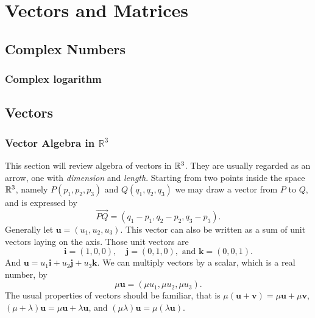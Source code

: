 \documentclass[main.tex]{subfiles}
\begin{document}
\chapter{Vectors and Matrices}
	\section{Complex Numbers}
		\subsection{Complex logarithm}
		
	\section{Vectors}
		\subsection{Vector Algebra in $\mathbb{R}^3$}
			This section will review algebra of vectors in $\mathbb R^3$. They are usually regarded as an arrow, one with \textit{dimension} and \textit{length}. Starting from two points inside the space $\mathbb R^3$, namely $P(p_1, p_2, p_3)$ and $Q(q_1, q_2, q_3)$ we may draw a vector from $P$ to $Q$, and is expressed by
			\begin{equation*}
				\overrightarrow{PQ} = (q_1 - p_1, q_2 - p_2, q_3 - p_3).
			\end{equation*}
			Generally let $\mathbf{u} = (u_1, u_2, u_3)$. This vector can also be written as a sum of unit vectors laying on the axis. Those unit vectors are
			\begin{equation*}
				\mathbf{i} = (1, 0, 0),\quad \mathbf{j} = (0, 1, 0),\text{ and } \mathbf{k} = (0, 0, 1).
			\end{equation*}
			And $\mathbf{u} = u_1\mathbf{i} + u_2\mathbf{j} +  u_3\mathbf{k}$. We can multiply vectors by a scalar, which is a real number, by
			\begin{equation*}
				\mu\mathbf{u} = (\mu u_1, \mu u_2, \mu u_3).
			\end{equation*}
			The usual properties of vectors should be familiar, that is $\mu(\mathbf{u} + \mathbf{v}) =\mu\mathbf{u} + \mu\mathbf{v}$, $(\mu + \lambda)\mathbf{u} = \mu\mathbf{u} + \lambda\mathbf{u}$, and $(\mu\lambda)\mathbf{u} = \mu(\lambda\mathbf{u})$. 
			
			
\end{document}
